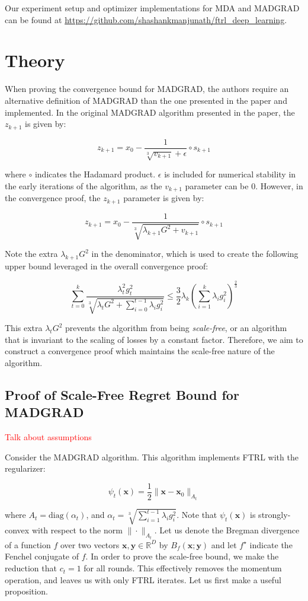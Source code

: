 \documentclass{article}
\newcommand{\R}{\mathbb{R}}
\newcommand{\diag}{\text{diag}}
\newcommand{\bx}{\mathbf{x}}
\newcommand{\by}{\mathbf{y}}
\newcommand{\todo}[1]{\textcolor{red}{#1}}
\begin{document}
Our experiment setup and optimizer implementations for MDA and MADGRAD can be found at
\url{https://github.com/shashankmanjunath/ftrl_deep_learning}.

\section{Theory}

When proving the convergence bound for MADGRAD, the authors require an alternative definition of
MADGRAD than the one presented in the paper and implemented. In the original MADGRAD algorithm presented in the paper,
the $z_{k+1}$ is given by:

\[
  z_{k+1} = x_0 - \frac{1}{\sqrt[3]{v_{k+1}} + \epsilon} \circ s_{k+1}
\]

where $\circ$ indicates the Hadamard product. $\epsilon$ is included for numerical stability in the early iterations of
the algorithm, as the $v_{k+1}$ parameter can be 0. However, in the convergence proof, the $z_{k+1}$ parameter is given
by:

\[
  z_{k+1} = x_0 - \frac{1}{\sqrt[3]{\lambda_{k+1}G^2 + v_{k+1}}} \circ s_{k+1}
\]

Note the extra $\lambda_{k+1}G^2$ in the denominator, which is used to create the following upper bound leveraged in the
overall convergence proof:

\[
  \sum\limits_{t=0}^k \frac{\lambda_t^2 g_t^2}{\sqrt[3]{\lambda_t G^2 + \sum\limits_{i=0}^{t-1} \lambda_i g_i^2}} \leq
  \frac{3}{2} \lambda_k \left(\sum\limits_{i=1}^k \lambda_i g_i^2\right)^{\frac{2}{3}}
\]

This extra $\lambda_t G^2$ prevents the algorithm from being \emph{scale-free}, or an algorithm that is invariant to the
scaling of losses by a constant factor. Therefore, we aim to construct a convergence proof which maintains the
scale-free nature of the algorithm.

\subsection{Proof of Scale-Free Regret Bound for MADGRAD}

\todo{Talk about assumptions}

Consider the MADGRAD algorithm. This algorithm implements FTRL with the regularizer: 

\[
  \psi_t(\bx) = \frac{1}{2} \|\bx - \bx_0 \|_{A_t}
\]

where $A_t = \diag(\alpha_t)$, and $\alpha_t = \sqrt[3]{\sum\limits_{i=1}^{t-1}\lambda_i g_i^2}$. Note that
$\psi_t(\bx)$ is strongly-convex with respect to the norm $\| \cdot \|_{A_t}$. Let us denote the Bregman divergence of a
function $f$ over two vectors $\bx, \by \in \R^D$ by $B_f(\bx; \by)$ and let $f^\star$ indicate the Fenchel conjugate of
$f$. In order to prove the scale-free bound, we make the reduction that $c_t = 1$ for all rounds. This effectively
removes the momentum operation, and leaves us with only FTRL iterates. Let us first make a useful proposition.
\end{document}
